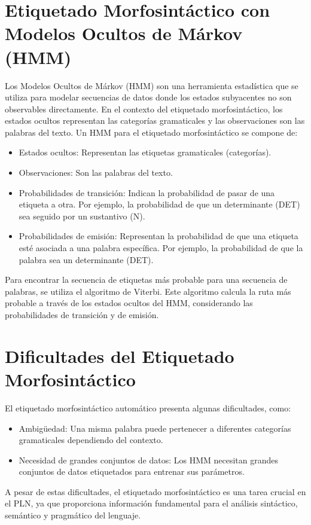 \documentclass{report}
\begin{document}
\section{Etiquetado Morfosintáctico con Modelos Ocultos de Márkov (HMM)}
Los Modelos Ocultos de Márkov (HMM) son una herramienta estadística que se utiliza para modelar secuencias de datos donde los estados subyacentes no son observables directamente. En el contexto del etiquetado morfosintáctico, los estados ocultos representan las categorías gramaticales y las observaciones son las palabras del texto.
Un HMM para el etiquetado morfosintáctico se compone de:
 \begin{itemize} \item Estados ocultos: Representan las etiquetas gramaticales (categorías). \item Observaciones: Son las palabras del texto. \item Probabilidades de transición: Indican la probabilidad de pasar de una etiqueta a otra. Por ejemplo, la probabilidad de que un determinante (DET) sea seguido por un sustantivo (N). \item Probabilidades de emisión: Representan la probabilidad de que una etiqueta esté asociada a una palabra específica. Por ejemplo, la probabilidad de que la palabra  sea un determinante (DET). \end{itemize}
Para encontrar la secuencia de etiquetas más probable para una secuencia de palabras, se utiliza el algoritmo de Viterbi.  Este algoritmo calcula la ruta más probable a través de los estados ocultos del HMM, considerando las probabilidades de transición y de emisión.
\section{Dificultades del Etiquetado Morfosintáctico}
El etiquetado morfosintáctico automático presenta algunas dificultades, como:
 \begin{itemize} \item Ambigüedad: Una misma palabra puede pertenecer a diferentes categorías gramaticales dependiendo del contexto. \item Necesidad de grandes conjuntos de datos: Los HMM necesitan grandes conjuntos de datos etiquetados para entrenar sus parámetros.
 \end{itemize}
A pesar de estas dificultades, el etiquetado morfosintáctico es una tarea crucial en el PLN, ya que proporciona información fundamental para el análisis sintáctico, semántico y pragmático del lenguaje.
\end{document}
